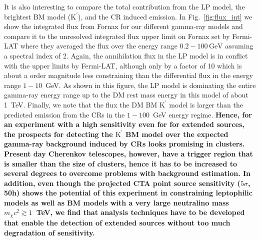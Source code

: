 \documentclass[10pt,aps,pra,reprint,amsmath,amsfonts,amssymb,showpacs,nofootinbib,floatfix]{revtex4-1}
\def\C#1{{\bf #1}}
\newcommand{\rmn}{\mathrm}
\newcommand{\Kp}{\rmn{K}^\prime}
\newcommand{\gev}{\rmn{GeV}}
\begin{document}
It is also interesting to compare the total contribution from the LP
model, the brightest BM model ($\Kp$), and the CR induced emission. In
Fig.~\ref{fig:flux_int} we show the integrated flux from Fornax for
our different gamma-ray models and compare it to the unresolved
integrated flux upper limit on Fornax set by Fermi-LAT where they
averaged the flux over the energy range $0.2-100\,\gev$ assuming a
spectral index of 2. Again, the annihilation flux in the LP model is
in conflict with the upper limits by Fermi-LAT, although only by a
factor of 10 which is about a order magnitude less constraining than
the differential flux in the energy range $1-10$~GeV. As shown in this
figure, the LP model is dominating the entire gamma-ray energy range
up to the DM rest mass energy in this model of about 1~TeV. Finally,
we note that the flux the DM BM $\Kp$ model is larger than the
predicted emission from the CRs in the $1-100$~GeV energy
regime. \C{Hence, for an experiment with a high sensitivity even for
  for extended sources, the prospects for detecting the $\Kp$ BM model
  over the expected gamma-ray background induced by CRs looks
  promising in clusters. Present day Cherenkov telescopes, however,
  have a trigger region that is smaller than the size of clusters,
  hence it has to be increased to several degrees to overcome problems
  with background estimation. In addition, even though the projected
  CTA point source sensitivity ($5\sigma$, 50h) shows the potential of
  this experiment in constraining leptophilic models as well as BM
  models with a very large neutralino mass $m_\chi c^2 \gtrsim 1$~TeV,
  we find that analysis techniques have to be developed that enable
  the detection of extended sources without too much degradation of
  sensitivity.}
\end{document}
